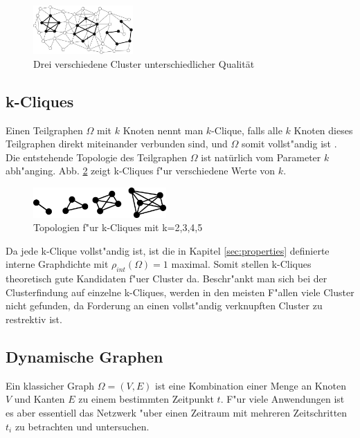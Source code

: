 \documentclass[journal]{vgtc}
\begin{document}
  \begin{figure}[h]
    \centering
    \includegraphics[width=1.5in]{images/good_cluster}
    \caption{\label{fig:comp_cluster} Drei verschiedene Cluster unterschiedlicher Qualität \cite{Schaeffer}}
  \end{figure}
  
  \subsection{k-Cliques}
  \label{sec:k_cliques}
  	Einen Teilgraphen $\Omega$ mit $k$ Knoten nennt man $k$-Clique, falls alle $k$ Knoten dieses 
  	Teilgraphen direkt miteinander verbunden sind, und $\Omega$ somit vollst"andig ist \cite{CPM}. 
  	Die entstehende Topologie des Teilgraphen $\Omega$ ist natürlich vom Parameter $k$ abh"anging.
  	Abb. \ref{fig:k_cliques} zeigt k-Cliques f"ur verschiedene Werte von $k$.
  	
  	\begin{figure}[h]
  	 \centering
  	 \includegraphics[width=2in]{images/k-cliques-example}
  	 \caption{\label{fig:k_cliques} Topologien f"ur k-Cliques mit k=2,3,4,5}
  	\end{figure}

  	
  	Da jede k-Clique vollst"andig ist, ist die in Kapitel \ref{sec:properties} definierte
  	interne Graphdichte mit $\rho_{int}(\Omega)=1$ maximal. Somit stellen k-Cliques theoretisch gute 
  	Kandidaten f"uer Cluster da. Beschr"ankt man sich bei der Clusterfindung auf einzelne k-Cliques,
  	werden in den meisten F"allen viele Cluster nicht gefunden, da Forderung an einen vollst"andig
  	verknupften Cluster zu restrektiv ist.
    
  \subsection{Dynamische Graphen}
	Ein klassicher Graph $\Omega=(V,E)$ ist eine Kombination einer Menge an Knoten $V$ und
	Kanten $E$ zu einem bestimmten Zeitpunkt $t$. F"ur viele Anwendungen
	ist es aber essentiell das Netzwerk "uber einen Zeitraum mit mehreren Zeitschritten $t_i$ zu
	betrachten und untersuchen.
	
\end{document}
